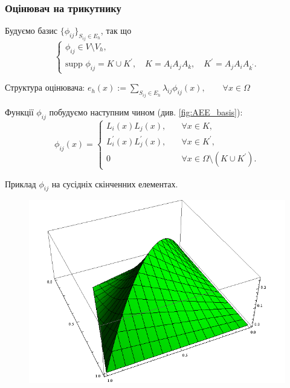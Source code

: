 
\begin{frame}[allowframebreaks]
	\frametitle<presentation>{Оцінювач на трикутнику}

	Будуємо базис $\lbrace \phi_{ij} \rbrace_{S_{ij} \in E_h}$, так що
%
	\begin{equation}\label{eq:basis_properties}
		\begin{cases}
			\phi_{ij} \in V \setminus V_h, \\
			\text{supp } \phi_{ij} = K \cup K^\prime, \quad K = A_iA_jA_k, \quad K^\prime = A_jA_iA_{k^\prime}.
		\end{cases}
	\end{equation}

		Структура оцінювача:
		$e_h(x) := \sum \limits_{S_{ij} \in E_h} \lambda_{ij} \phi_{ij}(x), \qquad \forall x \in \Omega$

		Функції $\phi_{ij}$ побудуємо наступним чином (див. \autoref{fig:AEE_basis}):
		\begin{equation}
			\phi_{ij}(x) =
			\begin{cases}
				L_i(x)L_j(x), &\quad \forall x \in K ,\\
				L_i^\prime(x)L_j^\prime(x), &\quad \forall x \in K^\prime ,\\
				0 &\quad \forall x \in \Omega \setminus (K \cup K^\prime).
			\end{cases}
		\end{equation}

\end{frame}

\begin{frame}{Приклад $\phi_{ij}$ на сусідніх скінченних елементах.}

		\begin{figure}[H]
			\centering
		    \includegraphics[height=0.75\textheight]{images/basis}
		    \label{fig:AEE_basis}
		\end{figure}

\end{frame}

